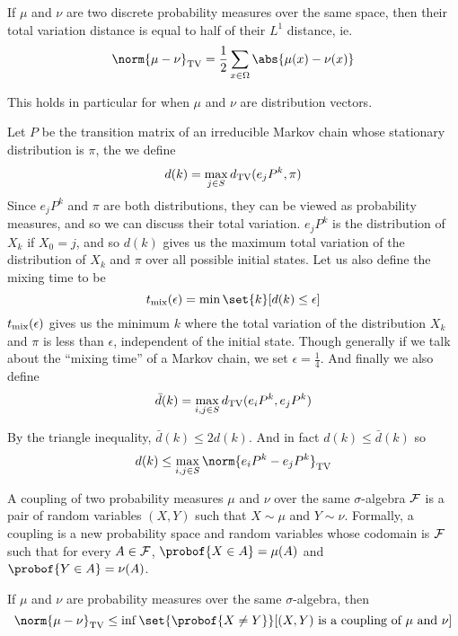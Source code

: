 \bprop

    If $\mu$ and $\nu$ are two discrete probability measures over the same space, then their total variation distance is equal to half of their $L^1$ distance, ie.
    $$ \norm{\mu-\nu}_{\rm TV} = \frac12\sum_{x\in\Omega}\abs{\mu(x)-\nu(x)} $$

\eprop

This holds in particular for when $\mu$ and $\nu$ are distribution vectors.

\bdefn

    Let $P$ be the transition matrix of an irreducible Markov chain whose stationary distribution is $\pi$, the we define
    $$ d(k) = \max_{j\in S}d_{\rm TV}(e_jP^k,\pi) $$
    Since $e_jP^k$ and $\pi$ are both distributions, they can be viewed as probability measures, and so we can discuss their total variation.
    $e_jP^k$ is the distribution of $X_k$ if $X_0=j$, and so $d(k)$ gives us the maximum total variation of the distribution of $X_k$ and $\pi$ over all possible initial states.
    Let us also define the {\emphcolor mixing time} to be
    $$ t_{\rm mix}(\epsilon) = \min\set{k}[d(k)\leq\epsilon] $$
    $t_{\rm mix}(\epsilon)$ gives us the minimum $k$ where the total variation of the distribution $X_k$ and $\pi$ is less than $\epsilon$, independent of the initial state.
    Though generally if we talk about the ``mixing time'' of a Markov chain, we set $\epsilon=\frac14$.
    And finally we also define
    $$ \bar d(k) = \max_{i,j\in S}d_{\rm TV}(e_iP^k,e_jP^k) $$

\edefn

By the triangle inequality, $\bar d(k)\leq2d(k)$.
And in fact $d(k)\leq\bar d(k)$ so
$$ d(k) \leq \max_{i,j\in S}\norm{e_iP^k-e_jP^k}_{\rm TV} $$

\bdefn

    A {\emphcolor coupling} of two probability measures $\mu$ and $\nu$ over the same $\sigma$-algebra ${\cal F}$ is a pair of random variables $(X,Y)$ such that $X\sim\mu$ and $Y\sim\nu$.
    Formally, a coupling is a new probability space and random variables whose codomain is ${\cal F}$ such that for every $A\in{\cal F}$, $\probof{X\in A}=\mu(A)$ and $\probof{Y\in A}=\nu(A)$.

\edefn

\bprop

    If $\mu$ and $\nu$ are probability measures over the same $\sigma$-algebra, then
    $$ \norm{\mu-\nu}_{\rm TV} \leq \inf\set{\probof{X\neq Y}}[\hbox{$(X,Y)$ is a coupling of $\mu$ and $\nu$}] $$

